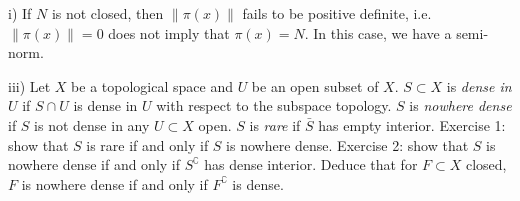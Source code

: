 \documentclass[12pt]{article}
\newenvironment{onquestion}[2][On Question]{\begin{trivlist}
\item[\hskip \labelsep {\bfseries #1}\hskip \labelsep {\bfseries #2.}]}{\end{trivlist}}
\begin{document}
\begin{onquestion}{1.6}
	(i) If $N$ is not closed, then $\|\pi(x)\|$ fails to be positive definite, i.e. $\|\pi(x)\| = 0$ does not imply that $\pi(x) = N$. In this case, we have a semi-norm.
\end{onquestion}

\begin{onquestion}{2.1}
	(iii) Let $X$ be a topological space and $U$ be an open subset of $X$. $S \subset X$ is \textit{dense in $U$} if $S\cap U$ is dense in $U$ with respect to the subspace topology. $S$ is \textit{nowhere dense} if $S$ is not dense in any $U \subset X$ open. $S$ is \textit{rare} if $\bar{S}$ has empty interior. Exercise 1: show that $S$ is rare if and only if $S$ is nowhere dense.  Exercise 2: show that $S$ is nowhere dense if and only if $S^\complement$ has dense interior. Deduce that for $F \subset X$ closed, $F$ is nowhere dense if and only if $F^\complement$ is dense.
	
\end{onquestion}
\end{document}
